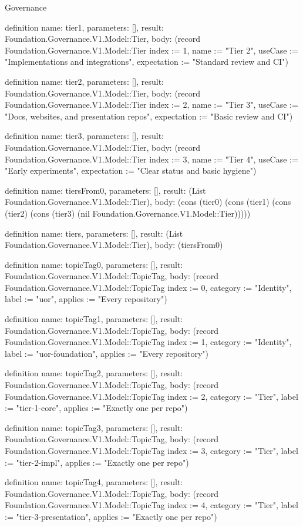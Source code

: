 \begin{lexlean}{Governance}
\begin{semanticmodule}
definition{
  name: tier1,
  parameters: [],
  result: Foundation.Governance.V1.Model::Tier,
  body: (record Foundation.Governance.V1.Model::Tier {index := 1, name := "Tier 2", useCase := "Implementations and integrations", expectation := "Standard review and CI"})
}

definition{
  name: tier2,
  parameters: [],
  result: Foundation.Governance.V1.Model::Tier,
  body: (record Foundation.Governance.V1.Model::Tier {index := 2, name := "Tier 3", useCase := "Docs, websites, and presentation repos", expectation := "Basic review and CI"})
}

definition{
  name: tier3,
  parameters: [],
  result: Foundation.Governance.V1.Model::Tier,
  body: (record Foundation.Governance.V1.Model::Tier {index := 3, name := "Tier 4", useCase := "Early experiments", expectation := "Clear status and basic hygiene"})
}

definition{
  name: tiersFrom0,
  parameters: [],
  result: (List Foundation.Governance.V1.Model::Tier),
  body: (cons (tier0) (cons (tier1) (cons (tier2) (cons (tier3) (nil Foundation.Governance.V1.Model::Tier)))))
}

definition{
  name: tiers,
  parameters: [],
  result: (List Foundation.Governance.V1.Model::Tier),
  body: (tiersFrom0)
}

definition{
  name: topicTag0,
  parameters: [],
  result: Foundation.Governance.V1.Model::TopicTag,
  body: (record Foundation.Governance.V1.Model::TopicTag {index := 0, category := "Identity", label := "uor", applies := "Every repository"})
}

definition{
  name: topicTag1,
  parameters: [],
  result: Foundation.Governance.V1.Model::TopicTag,
  body: (record Foundation.Governance.V1.Model::TopicTag {index := 1, category := "Identity", label := "uor-foundation", applies := "Every repository"})
}

definition{
  name: topicTag2,
  parameters: [],
  result: Foundation.Governance.V1.Model::TopicTag,
  body: (record Foundation.Governance.V1.Model::TopicTag {index := 2, category := "Tier", label := "tier-1-core", applies := "Exactly one per repo"})
}

definition{
  name: topicTag3,
  parameters: [],
  result: Foundation.Governance.V1.Model::TopicTag,
  body: (record Foundation.Governance.V1.Model::TopicTag {index := 3, category := "Tier", label := "tier-2-impl", applies := "Exactly one per repo"})
}

definition{
  name: topicTag4,
  parameters: [],
  result: Foundation.Governance.V1.Model::TopicTag,
  body: (record Foundation.Governance.V1.Model::TopicTag {index := 4, category := "Tier", label := "tier-3-presentation", applies := "Exactly one per repo"})
}


\end{semanticmodule}
\end{lexlean}
